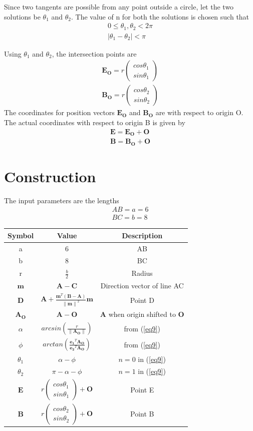 \documentclass[journal,10pt,twocolumn]{article}
\providecommand{\norm}[1]{\left\lVert#1\right\rVert}
\let\vec\mathbf
\newcommand{\myvec}[1]{\ensuremath{\begin{pmatrix}#1\end{pmatrix}}}
\begin{document}
Since two tangents are possible from any point outside a circle, let the two solutions be $\theta_1$ and $\theta_2$. The value of n for both the solutions is chosen such that
\begin{eqnarray}
	0 \le \theta_1,\theta_2 < 2\pi\\
	|\theta_1-\theta_2| < \pi
\end{eqnarray}

Using $\theta_1$ and $\theta_2$, the intersection points are
\begin{eqnarray}
	\vec{E_O} = r\myvec{cos\theta_1\\sin\theta_1}\\
	\vec{B_O} = r\myvec{cos\theta_2\\sin\theta_2}
\end{eqnarray}
The coordinates for position vectors $\vec{E_O}$ and $\vec{B_O}$ are with respect to origin O. The actual coordinates with respect to origin B is given by 
\begin{eqnarray}
	\vec{E} = \vec{E_O} + \vec{O}\\
	\vec{B} = \vec{B_O} + \vec{O}
\end{eqnarray}

\section*{\large Construction}
The input parameters are the lengths
\begin{eqnarray*}
	AB = a = 6\\
	BC = b = 8
\end{eqnarray*}
{
\setlength\extrarowheight{5pt}
\begin{tabular}{|c|c|c|}
	\hline
	\textbf{Symbol}&\textbf{Value}&\textbf{Description}\\
	\hline
	a&6&AB\\
	\hline
	b&8&BC\\
	\hline
	r&$\frac{b}{2}$&Radius\\
	\hline
	$\vec{m}$&$\vec{A-C}$&Direction vector of line AC\\
	\hline
	$\vec{D}$&$\vec{A} + \frac{\vec{m}^T(\vec{B-A})}{\norm{\vec{m}}^2}\vec{m}$&Point D\\[5pt]
	\hline
	$\vec{A_O}$&$\vec{A-O}$&$\vec{A}$ when origin shifted to $\vec{O}$\\
	\hline
	$\alpha$&$arcsin(\frac{r}{\norm{\vec{A_O}}})$&from (\ref{eq9})\\[10pt]
	\hline
	$\phi$&$arctan(\frac{\vec{e_1}^T\vec{A_O}}{\vec{e_2}^T\vec{A_O}})$&from (\ref{eq9})\\[10pt]
	\hline
	$\theta_1$&$\alpha-\phi$&$n = 0$ in (\ref{eq9})\\ 
	\hline
	$\theta_2$&$\pi-\alpha-\phi$&$n = 1$ in (\ref{eq9})\\
	\hline
	$\vec{E}$&$r\myvec{cos\theta_1\\sin\theta_1}+\vec{O}$&Point E\\[5pt]
	\hline
	$\vec{B}$&$r\myvec{cos\theta_2\\sin\theta_2}+\vec{O}$&Point B\\[5pt]
	\hline
\end{tabular}
}
\end{document}
